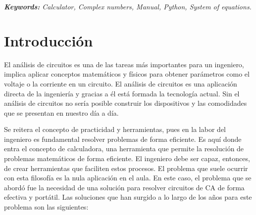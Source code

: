 \documentclass[12pt,a4paper]{article}
\begin{document}
\noindent \textit{\textbf{Keywords:} Calculator, Complex numbers, Manual, Python, System of equations.}

\section{Introducción}
El análisis de circuitos es una de las tareas más importantes para un ingeniero, implica aplicar conceptos matemáticos y físicos para obtener parámetros como el voltaje o la corriente en un circuito. El análisis de circuitos es una aplicación directa de la ingeniería y gracias a él está formada la tecnología actual. Sin el análisis de circuitos no sería posible construir los dispositivos y las comodidades que se presentan en nuestro día a día. \\

Se reitera el concepto de practicidad y herramientas, pues en la labor del ingeniero es fundamental resolver problemas de forma eficiente. Es aquí donde entra el concepto de calculadora, una herramienta que permite la resolución de problemas matemáticos de forma eficiente. El ingeniero debe ser capaz, entonces, de crear herramientas que faciliten estos procesos. El problema que suele ocurrir con esta filosofía es la nula aplicación en el aula. En este caso, el problema que se abordó fue la necesidad de una solución para resolver circuitos de CA de forma efectiva y portátil. Las soluciones que han surgido a lo largo de los años para este problema son las siguientes:
\end{document}
